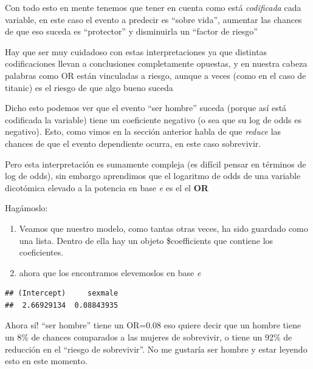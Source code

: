 \documentclass[
]{book}
\newenvironment{Shaded}{\begin{snugshade}}{\end{snugshade}}
\newcommand{\FunctionTok}[1]{\textcolor[rgb]{0.00,0.00,0.00}{#1}}
\newcommand{\NormalTok}[1]{#1}
\newcommand{\SpecialCharTok}[1]{\textcolor[rgb]{0.00,0.00,0.00}{#1}}
\begin{document}
Con todo esto en mente tenemos que tener en cuenta como está \emph{codificada} cada variable, en este caso el evento a predecir es ``sobre vida'', aumentar las chances de que eso suceda es ``protector'' y disminuirla un ``factor de riesgo''

Hay que ser muy cuidadoso con estas interpretaciones ya que distintas codificaciones llevan a conclusiones completamente opuestas, y en nuestra cabeza palabras como OR están vinculadas a riesgo, aunque a veces (como en el caso de titanic) es el riesgo de que algo bueno suceda

Dicho esto podemos ver que el evento ``ser hombre'' suceda (porque así está codificada la variable) tiene un coeficiente negativo (o sea que su log de odds es negativo). Esto, como vimos en la sección anterior habla de que \emph{reduce} las chances de que el evento dependiente ocurra, en este caso sobrevivir.

Pero esta interpretación es sumamente compleja (es difícil pensar en términos de log de odds), sin embargo aprendimos que el logaritmo de odds de una variable dicotómica elevado a la potencia en base \emph{e} es el el \textbf{OR}

Hagámoslo:

\begin{enumerate}
\def\labelenumi{\arabic{enumi}.}
\item
  Veamos que nuestro modelo, como tantas otras veces, ha sido guardado como una lista. Dentro de ella hay un objeto \$coefficients que contiene los coeficientes.
\item
  ahora que los encontramos elevemoslos en base \emph{e}
\end{enumerate}

\begin{Shaded}
\end{Shaded}

\begin{verbatim}
## (Intercept)     sexmale 
##  2.66929134  0.08843935
\end{verbatim}

Ahora sí! ``ser hombre'' tiene un OR=0.08 eso quiere decir que un hombre tiene un 8\% de chances comparados a las mujeres de sobrevivir, o tiene un 92\% de reducción en el ``riesgo de sobrevivir''. No me gustaría ser hombre y estar leyendo esto en este momento.
\end{document}
